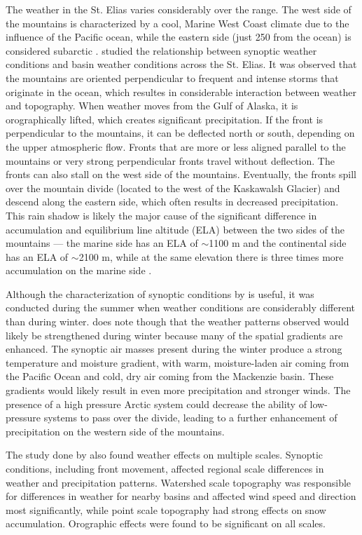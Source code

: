 \documentclass[12pt]{article}
\begin{document}
The weather in the St. Elias varies considerably over the range. The west side of the mountains is characterized by a cool, Marine West Coast climate due to the influence of the Pacific ocean, while the eastern side (just 250 from the ocean) is considered subarctic \citep{Marcus1970}. \cite{Taylor1969} studied the relationship between synoptic weather conditions and basin weather conditions across the St. Elias. It was observed that the mountains are oriented perpendicular to frequent and intense storms that originate in the ocean, which resultes in considerable interaction between weather and topography. When weather moves from the Gulf of Alaska, it is orographically lifted, which creates significant precipitation. If the front is perpendicular to the mountains, it can be deflected north or south, depending on the upper atmospheric flow. Fronts that are more or less aligned parallel to the mountains or very strong perpendicular fronts travel without deflection. The fronts can also stall on the west side of the mountains. Eventually, the fronts spill over the mountain divide (located to the west of the Kaskawalsh Glacier) and descend along the eastern side, which often results in decreased precipitation. This rain shadow is likely the major cause of the significant difference in accumulation and equilibrium line altitude (ELA) between the two sides of the mountains --- the marine side has an ELA of $\sim$1100 m and the continental side has an ELA of $\sim$2100 m, while at the same elevation there is three times more accumulation on the marine side \citep{Marcus1970}.

Although the characterization of synoptic conditions by \cite{Taylor1969} is useful, it was conducted during the summer when weather conditions are considerably different than during winter. \cite{Taylor1969} does note though that the weather patterns observed would likely be strengthened during winter because many of the spatial gradients are enhanced. The synoptic air masses present during the winter produce a strong temperature and moisture gradient, with warm, moisture-laden air coming from the Pacific Ocean and cold, dry air coming from the Mackenzie basin. These gradients would likely result in even more precipitation and stronger winds. The presence of a high pressure Arctic system could decrease the ability of low-pressure systems to pass over the divide, leading to a further enhancement of precipitation on the western side of the mountains. 

The study done by \cite{Taylor1969} also found weather effects on multiple scales. Synoptic conditions, including front movement, affected regional scale differences in weather and precipitation patterns. Watershed scale topography was responsible for differences in weather for nearby basins and affected wind speed and direction most significantly, while point scale topography had strong effects on snow accumulation. Orographic effects were found to be significant on all scales. 
\end{document}
